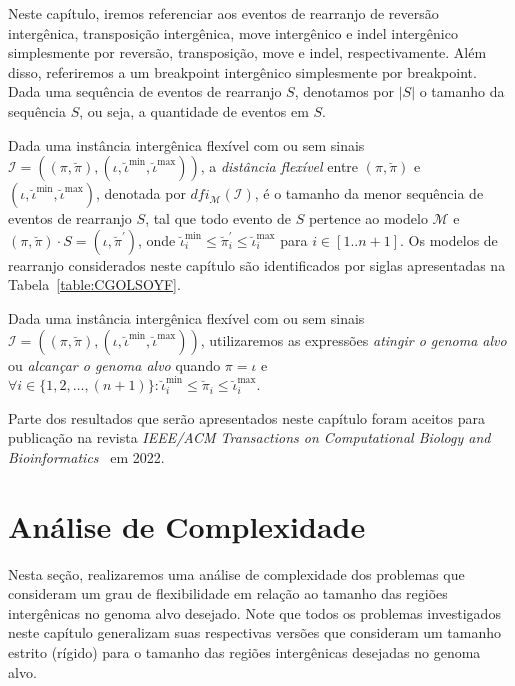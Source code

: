 Neste capítulo, iremos referenciar aos eventos de rearranjo de reversão intergênica, transposição intergênica, move intergênico e indel intergênico simplesmente por reversão, transposição, move e indel, respectivamente. Além disso, referiremos a um breakpoint intergênico simplesmente por breakpoint. Dada uma sequência de eventos de rearranjo $S$, denotamos por $|S|$ o tamanho da sequência $S$, ou seja, a quantidade de eventos em $S$.

Dada uma instância intergênica flexível com ou sem sinais $\mathcal{I} = ((\pi,\breve\pi),(\iota,\breve\iota^{\min},\breve\iota^{\max}))$, a \emph{distância flexível} entre $(\pi,\breve\pi)$ e $(\iota,\breve\iota^{\min},\breve\iota^{\max})$, denotada por $dfi_{\mathcal{M}}(\mathcal{I})$, é o tamanho da menor sequência de eventos de rearranjo $S$, tal que todo evento de $S$ pertence ao modelo $\mathcal{M}$ e $(\pi,\breve\pi) \cdot S = (\iota,\breve\pi^{\prime})$, onde $\breve\iota^{\min}_i \le \breve\pi^{\prime}_i \le \breve\iota^{\max}_i$ para $i \in [1..n+1]$. Os modelos de rearranjo considerados neste capítulo são identificados por siglas apresentadas na Tabela~\ref{table:CGOLSOYF}.



Dada uma instância intergênica flexível com ou sem sinais $\mathcal{I} = ((\pi,\breve\pi),(\iota,\breve\iota^{\min},\breve\iota^{\max}))$, utilizaremos as expressões \emph{atingir o genoma alvo} ou \emph{alcançar o genoma alvo} quando $\pi = \iota$ e $\forall i \in \{1,2,\dots,({n+1})\}: \breve\iota^{\min}_i \le \breve\pi_i \le \breve\iota^{\max}_i$.

Parte dos resultados que serão apresentados neste capítulo foram aceitos para publicação na revista \emph{IEEE/ACM Transactions on Computational Biology and Bioinformatics}~\cite{2022a-brito-etal} em 2022.

\section{Análise de Complexidade}

Nesta seção, realizaremos uma análise de complexidade dos problemas que consideram um grau de flexibilidade em relação ao tamanho das regiões intergênicas no genoma alvo desejado. Note que todos os problemas investigados neste capítulo generalizam suas respectivas versões que consideram um tamanho estrito (rígido) para o tamanho das regiões intergênicas desejadas no genoma alvo.

